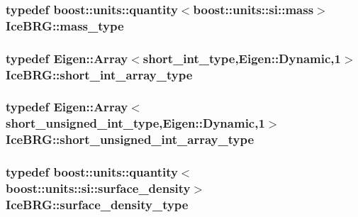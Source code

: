 \hypertarget{namespaceIceBRG_a1be72ac4918a9b029f2eefa084213e35}{
\subsubsection[{mass\-\_\-type}]{\setlength{\rightskip}{0pt plus 5cm}typedef boost\-::units\-::quantity$<$boost\-::units\-::si\-::mass$>$ {\bf Ice\-B\-R\-G\-::mass\-\_\-type}}}\label{namespaceIceBRG_a1be72ac4918a9b029f2eefa084213e35}
\hypertarget{namespaceIceBRG_a5dfb15d72d312a490f6e4db9e75f4359}{
\subsubsection[{short\-\_\-int\-\_\-array\-\_\-type}]{\setlength{\rightskip}{0pt plus 5cm}typedef Eigen\-::\-Array$<${\bf short\-\_\-int\-\_\-type},Eigen\-::\-Dynamic,1$>$ {\bf Ice\-B\-R\-G\-::short\-\_\-int\-\_\-array\-\_\-type}}}\label{namespaceIceBRG_a5dfb15d72d312a490f6e4db9e75f4359}
\hypertarget{namespaceIceBRG_a7acb9cc3ca6afdd487166f5c720a308c}{
\subsubsection[{short\-\_\-unsigned\-\_\-int\-\_\-array\-\_\-type}]{\setlength{\rightskip}{0pt plus 5cm}typedef Eigen\-::\-Array$<${\bf short\-\_\-unsigned\-\_\-int\-\_\-type},Eigen\-::\-Dynamic,1$>$ {\bf Ice\-B\-R\-G\-::short\-\_\-unsigned\-\_\-int\-\_\-array\-\_\-type}}}\label{namespaceIceBRG_a7acb9cc3ca6afdd487166f5c720a308c}
\hypertarget{namespaceIceBRG_a80c597ef5ba0a32491d32a9f0083b02d}{
\subsubsection[{surface\-\_\-density\-\_\-type}]{\setlength{\rightskip}{0pt plus 5cm}typedef boost\-::units\-::quantity$<$boost\-::units\-::si\-::surface\-\_\-density$>$ {\bf Ice\-B\-R\-G\-::surface\-\_\-density\-\_\-type}}}\label{namespaceIceBRG_a80c597ef5ba0a32491d32a9f0083b02d}
